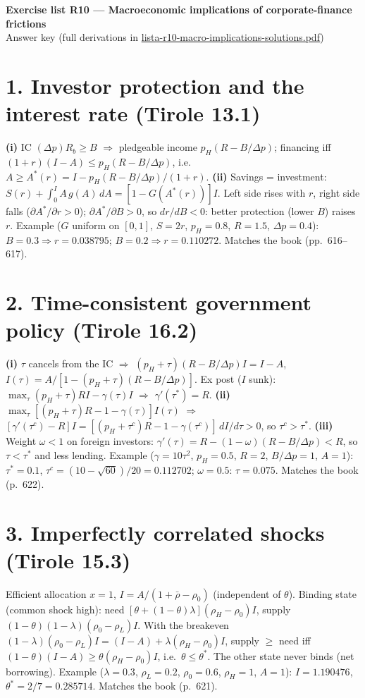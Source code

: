 \documentclass[11pt,a4paper]{article}
\begin{document}
\begin{center}{\Large\bfseries Exercise list R10 --- Macroeconomic implications of corporate-finance frictions}\\[4pt]{\large Answer key (full derivations in \url{lista-r10-macro-implications-solutions.pdf})}\end{center}

\section*{1. Investor protection and the interest rate (Tirole 13.1)}
\textbf{(i)} IC $(\Delta p)R_b\geq B$ $\Rightarrow$ pledgeable income $p_H(R-B/\Delta p)$; financing iff $(1+r)(I-A)\leq p_H(R-B/\Delta p)$, i.e.\ $A\geq A^*(r)=I-p_H(R-B/\Delta p)/(1+r)$.
\textbf{(ii)} Savings = investment: $S(r)+\int_0^IA\,g(A)\,dA=[1-G(A^*(r))]I$. Left side rises with $r$, right side falls ($\partial A^*/\partial r>0$); $\partial A^*/\partial B>0$, so $dr/dB<0$: better protection (lower $B$) raises $r$.
Example ($G$ uniform on $[0,1]$, $S=2r$, $p_H=0.8$, $R=1.5$, $\Delta p=0.4$): $B=0.3\Rightarrow r=0.038795$; $B=0.2\Rightarrow r=0.110272$. Matches the book (pp.~616--617).

\section*{2. Time-consistent government policy (Tirole 16.2)}
\textbf{(i)} $\tau$ cancels from the IC $\Rightarrow$ $(p_H+\tau)(R-B/\Delta p)I=I-A$, $I(\tau)=A/[1-(p_H+\tau)(R-B/\Delta p)]$. Ex post ($I$ sunk): $\max_\tau(p_H+\tau)RI-\gamma(\tau)I$ $\Rightarrow$ $\gamma'(\tau^*)=R$.
\textbf{(ii)} $\max_\tau[(p_H+\tau)R-1-\gamma(\tau)]I(\tau)$ $\Rightarrow$ $[\gamma'(\tau^c)-R]I=[(p_H+\tau^c)R-1-\gamma(\tau^c)]\,dI/d\tau>0$, so $\tau^c>\tau^*$.
\textbf{(iii)} Weight $\omega<1$ on foreign investors: $\gamma'(\tau)=R-(1-\omega)(R-B/\Delta p)<R$, so $\tau<\tau^*$ and less lending.
Example ($\gamma=10\tau^2$, $p_H=0.5$, $R=2$, $B/\Delta p=1$, $A=1$): $\tau^*=0.1$, $\tau^c=(10-\sqrt{60})/20=0.112702$; $\omega=0.5$: $\tau=0.075$. Matches the book (p.~622).

\section*{3. Imperfectly correlated shocks (Tirole 15.3)}
Efficient allocation $x=1$, $I=A/(1+\bar\rho-\rho_0)$ (independent of $\theta$). Binding state (common shock high): need $[\theta+(1-\theta)\lambda](\rho_H-\rho_0)I$, supply $(1-\theta)(1-\lambda)(\rho_0-\rho_L)I$. With the breakeven $(1-\lambda)(\rho_0-\rho_L)I=(I-A)+\lambda(\rho_H-\rho_0)I$, supply $\geq$ need iff $(1-\theta)(I-A)\geq\theta(\rho_H-\rho_0)I$, i.e.\ $\theta\leq\theta^*$. The other state never binds (net borrowing).
Example ($\lambda=0.3$, $\rho_L=0.2$, $\rho_0=0.6$, $\rho_H=1$, $A=1$): $I=1.190476$, $\theta^*=2/7=0.285714$. Matches the book (p.~621).
\end{document}
